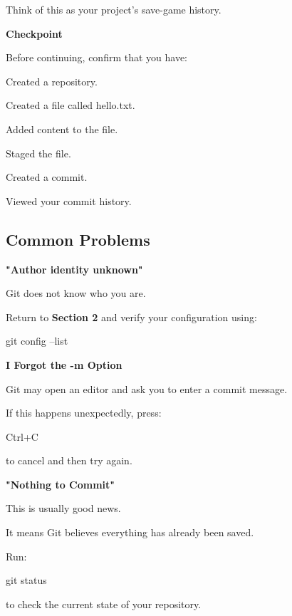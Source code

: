 \documentclass{csc2059practical}
\begin{document}
Think of this as your project's save-game history.

\begin{reflectionbox}
\textbf{Checkpoint}\par
\medskip

Before continuing, confirm that you have:


Created a repository.


Created a file called hello.txt.


Added content to the file.


Staged the file.


Created a commit.


Viewed your commit history.


\end{reflectionbox}
\subsection{Common Problems}
\begin{commonerror}
\textbf{"Author identity unknown"}\par
\medskip

Git does not know who you are.


Return to \textbf{Section 2} and verify your configuration using:


\end{commonerror}
\begin{terminalplain}
git config --list
\end{terminalplain}
\begin{commonerror}
\textbf{I Forgot the -m Option}\par
\medskip

Git may open an editor and ask you to enter a commit message.


If this happens unexpectedly, press:


\end{commonerror}
\begin{terminalplain}
Ctrl+C
\end{terminalplain}
to cancel and then try again.

\begin{commonerror}
\textbf{"Nothing to Commit"}\par
\medskip

This is usually good news.


It means Git believes everything has already been saved.


Run:


\end{commonerror}
\begin{terminalplain}
git status
\end{terminalplain}
to check the current state of your repository.
\end{document}
